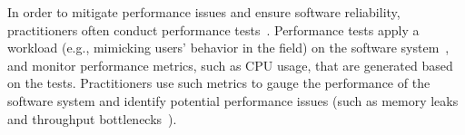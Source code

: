 


In order to mitigate performance issues and ensure software reliability, practitioners often conduct performance tests~\cite{futureofspe}. Performance tests apply a workload (e.g., mimicking users' behavior in the field) on the software system~\cite{ranjanbook,Syer2016}, and monitor performance metrics, such as CPU usage, that are generated based on the tests. Practitioners use such metrics to gauge the performance of the software system and identify potential performance issues (such as memory leaks~\cite{markicsm2013} and throughput bottlenecks~\cite{5635038}).



